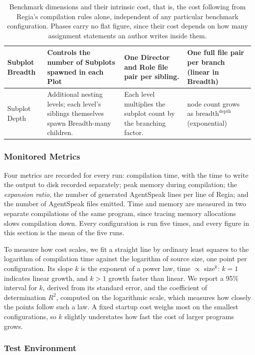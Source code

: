 \begin{table}[htpb]
\begin{tabular}{|p{2.0cm}|p{4.0cm}|p{4.4cm}|p{3.0cm}|}
\hline
Subplot Breadth & Controls the number of Subplots spawned in each Plot & One Director and Role file pair per sibling. & One full file pair per branch (linear in Breadth) \\
\hline
Subplot Depth & Additional nesting levels; each level's siblings themselves spawn Breadth-many children. & Each level multiplies the subplot count by the branching factor. & node count grows as $\text{breadth}^{\text{depth}}$ (exponential) \\
\hline
\end{tabular}
\caption{Benchmark dimensions and their intrinsic cost, that is, the cost following from Regia's compilation rules alone, independent of any particular benchmark configuration. Phases carry no flat figure, since their cost depends on how many assignment statements an author writes inside them.}
\label{tab:benchmark-dimensions}
\end{table}

\subsubsection{Monitored Metrics}
\label{sec:benchmark-metrics}

Four metrics are recorded for every run: compilation time, with the time to write the output to disk recorded separately; peak memory during compilation; the \emph{expansion ratio}, the number of generated AgentSpeak lines per line of Regia; and the number of AgentSpeak files emitted. Time and memory are measured in two separate compilations of the same program, since tracing memory allocations slows compilation down. Every configuration is run five times, and every figure in this section is the mean of the five runs.

To measure how cost scales, we fit a straight line by ordinary least squares to the logarithm of compilation time against the logarithm of source size, one point per configuration. Its slope $k$ is the exponent of a power law, time $\propto$ size$^{k}$: $k = 1$ indicates linear growth, and $k > 1$ growth faster than linear. We report a 95\% interval for $k$, derived from its standard error, and the coefficient of determination $R^2$, computed on the logarithmic scale, which measures how closely the points follow such a law. A fixed startup cost weighs most on the smallest configurations, so $k$ slightly understates how fast the cost of larger programs grows.

\subsubsection{Test Environment}
\label{sec:benchmark-environment}

